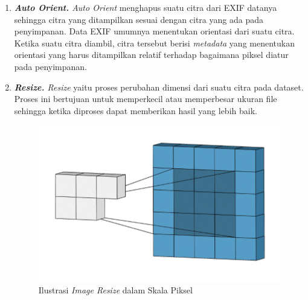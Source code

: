 \begin{enumerate}
    \item \textit{\textbf{Auto Orient.} Auto Orient} menghapus suatu citra dari EXIF datanya sehingga citra yang ditampilkan sesuai dengan citra yang ada pada penyimpanan. Data EXIF umumnya menentukan orientasi dari suatu citra. Ketika suatu citra diambil, citra tersebut berisi \textit{metadata} yang menentukan orientasi yang harus ditampilkan relatif terhadap bagaimana piksel diatur pada penyimpanan.
    \item \textit{\textbf{Resize.} Resize} yaitu proses perubahan dimensi dari suatu citra pada dataset. Proses ini bertujuan untuk memperkecil atau memperbesar ukuran file sehingga ketika diproses dapat memberikan hasil yang lebih baik. 
    \begin{figure}[H]
        \centering
        \includegraphics[scale=0.65]{gambar/imageresize.png}
        \caption{Ilustrasi \textit{Image Resize} dalam Skala Piksel}
        \label{fig:imageresize}
    \end{figure}

\end{enumerate}

